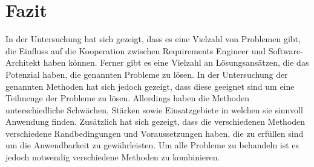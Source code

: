 \section{Fazit}
In der Untersuchung hat sich gezeigt, dass es eine Vielzahl von Problemen gibt, die Einfluss auf die Kooperation zwischen Requirements Engineer und Software-Architekt haben k\"onnen. Ferner gibt es eine Vielzahl an L\"osungsans\"atzen, die das Potenzial haben, die genannten Probleme zu l\"osen. In der Untersuchung der genannten Methoden hat sich jedoch gezeigt, dass diese geeignet sind um eine Teilmenge der Probleme zu l\"osen. Allerdings haben die Methoden unterschiedliche Schw\"achen, St\"arken sowie Einsatzgebiete in welchen sie sinnvoll Anwendung finden. Zus\"atzlich hat sich gezeigt, dass die verschiedenen Methoden verschiedene Randbedingungen und Voraussetzungen haben, die zu erf\"ullen sind um die Anwendbarkeit zu gew\"ahrleisten. Um alle Probleme zu behandeln ist es jedoch notwendig verschiedene Methoden zu kombinieren. \\